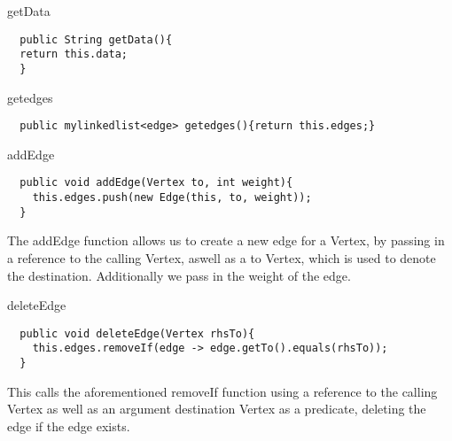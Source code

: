 \documentclass[a4paper]{article}
\begin{document}
\vspace{6mm}

\begin{algorithm}
\caption{getData}\label{euclid}
\begin{verbatim}
  public String getData(){
  return this.data;
  }
\end{verbatim}
\end{algorithm}
\newpage


\begin{algorithm}
\caption{getedges}\label{euclid}
\begin{verbatim}
  public mylinkedlist<edge> getedges(){return this.edges;}
\end{verbatim}
\end{algorithm}




\begin{algorithm}
\caption{addEdge}\label{euclid}
\begin{verbatim}
  public void addEdge(Vertex to, int weight){
    this.edges.push(new Edge(this, to, weight));
  }
\end{verbatim}
\end{algorithm}

\vspace{4mm}

The addEdge function allows us to create a new edge for a Vertex,
by passing in a reference to the calling Vertex, aswell as a to Vertex,
which is used to denote the destination. Additionally we pass in the weight of the edge.


\vspace{4mm}
\begin{algorithm}
\caption{deleteEdge}\label{euclid}
\begin{verbatim}
  public void deleteEdge(Vertex rhsTo){
    this.edges.removeIf(edge -> edge.getTo().equals(rhsTo));
  }
\end{verbatim}
\end{algorithm}


This calls the aforementioned removeIf function using a reference to 
the calling Vertex as well as an argument destination Vertex as a predicate, 
deleting the edge if the edge exists.

\newpage


\vspace*{0pt}
\end{document}
